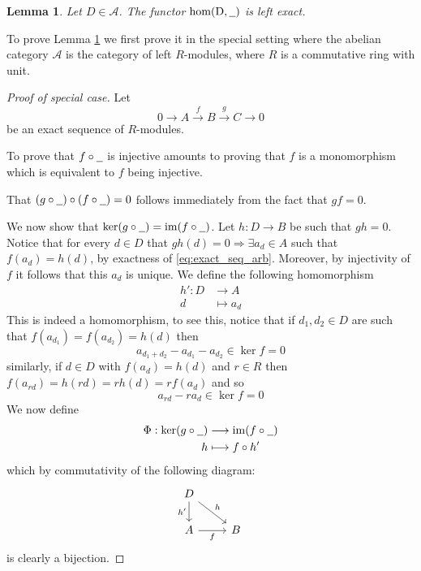\documentclass[12pt]{article}
\theoremstyle{plain}
\newtheorem{lemma}[thm]{Lemma}
\theoremstyle{definition}
\newcommand{\scr}[1]{\mathscr{#1}}
\newcommand{\und}[1]{\underline{\hspace{#1 cm}}}
\newcommand{\lto}{\longrightarrow}
\begin{document}
\begin{lemma}\label{lem:hom_left_exact}
Let $D \in \scr{A}$. The functor $\operatorname{hom(D,\und{0.2})}$ is left exact.
\end{lemma}
To prove Lemma \ref{lem:hom_left_exact} we first prove it in the special setting where the abelian category $\scr{A}$ is the category of left $R$-modules, where $R$ is a commutative ring with unit.
\begin{proof}[Proof of special case]
Let
\begin{equation}\label{eq:exact_seq_arb}
0 \lto A\stackrel{f}{\lto} B \stackrel{g}{\lto}C \lto 0
\end{equation}
be an exact sequence of $R$-modules.

To prove that $f \circ \und{0.2}$ is injective amounts to proving that $f$ is a monomorphism which is equivalent to $f$ being injective.

That $(g \circ \und{0.2})\circ(f\circ \und{0.2}) = 0$ follows immediately from the fact that $gf = 0$.

We now show that $\operatorname{ker}(g\circ\und{0.2}) = \operatorname{im}(f\circ\und{0.2})$. Let $h: D \lto B$ be such that $gh = 0$. Notice that for every $d \in D$ that $gh(d) = 0 \Rightarrow \exists a_d \in A$ such that $f(a_d) = h(d)$, by exactness of \eqref{eq:exact_seq_arb}.  Moreover, by injectivity of $f$ it follows that this $a_d$ is unique. We define the following homomorphism
\begin{align*}
h': D &\lto A\\
d &\longmapsto a_d
\end{align*}
This is indeed a homomorphism, to see this, notice that if $d_1,d_2 \in D$ are such that $f(a_{d_1}) = f(a_{d_2}) = h(d)$ then
\begin{equation}
a_{d_1 + d_2} - a_{d_1} - a_{d_2} \in \operatorname{ker}f = 0
\end{equation}
similarly, if $d \in D$ with $f(a_d) = h(d)$ and $r \in R$ then $f(a_{rd}) = h(rd) = rh(d) = rf(a_d)$ and so
\begin{equation}
a_{rd} - ra_d \in \operatorname{ker}f = 0
\end{equation}
We now define
\begin{align*}
\Phi: \operatorname{ker}(g \circ \und{0.2}) &\lto \operatorname{im}(f \circ \und{0.2})\\
h &\longmapsto f\circ h'
\end{align*}
which by commutativity of the following diagram:
\begin{equation}
\begin{tikzcd}
D\arrow[d,swap,"{h'}"]\arrow[dr,"{h}"]\\
A\arrow[r,swap,"{f}"] & B
\end{tikzcd}
\end{equation}
is clearly a bijection.
\end{proof}
\end{document}
